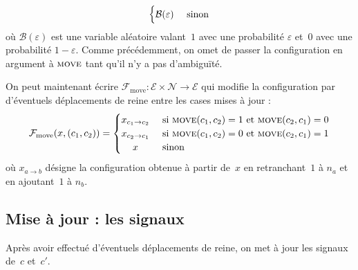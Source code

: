 \documentclass[11pt, openany, a4paper]{article}
\newcommand{\Ne}{\mathcal{N}}
\newcommand{\M}{\textsc{move}}
\newcommand{\E}{\mathcal{E}}
\begin{document}
\begin{itemize}
{\[\begin{cases}
      \hfill \mathcal{B}(\varepsilon)\hfill  & \text{ sinon} \\
    \end{cases}
\]
où $\mathcal{B}(\varepsilon)$ est une variable aléatoire valant~$1$ avec une probabilité $\varepsilon$ et~$0$ avec une probabilité $1-\varepsilon$. Comme précédemment, on omet de passer la configuration en argument à $\M$ tant qu'il n'y a pas d'ambiguïté.
}


\end{itemize}

\medskip

On peut maintenant écrire $\mathcal{F}_{\mathrm{move}} : \E\times\Ne\to\E$ qui modifie la configuration par d'éventuels déplacements de reine entre les cases mises à jour :  \[
\mathcal{F}_{\mathrm{move}}(x,(c_1, c_2)) = 
\begin{cases}
  \hfill x_{c_1\to c_2} \hfill & \text{ si $\M(c_1, c_2) = 1$ et $\M(c_2, c_1) = 0$} \\
  \hfill x_{c_2 \to c_1} \hfill & \text{ si $\M(c_1, c_2) = 0$ et $\M(c_2, c_1) = 1$} \\
  \hfill x \hfill & \text{ sinon} \\
  \end{cases}
\]
où $x_{a \to b}$ désigne la configuration obtenue à partir de~$x$ en retranchant~$1$ à $n_{a}$ et en ajoutant~$1$ à $n_{b}$. 

\medskip



\subsection{Mise à jour : les signaux}  

Après avoir effectué d'éventuels déplacements de reine, on met à jour les signaux de~$c$ et~$c'$. 
\end{document}
